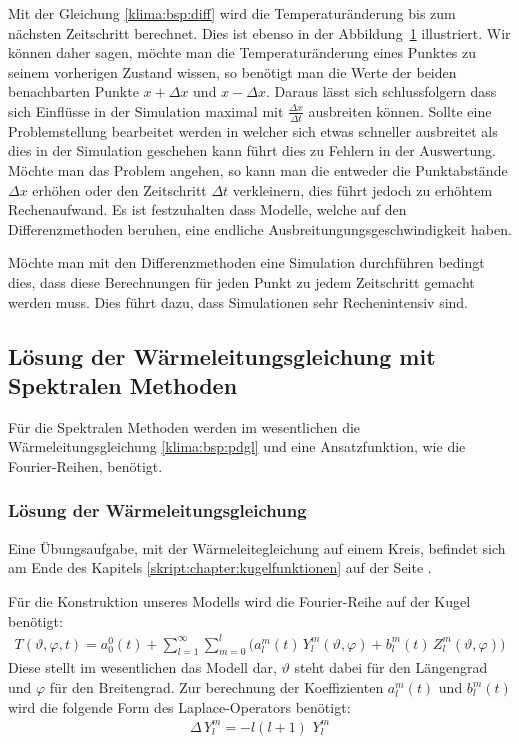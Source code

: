 \begin{refsection}
\begin{figure}
\caption{
\label{klima:wettervorhersagen:diff}}
\end{figure}
Mit der Gleichung \eqref{klima:bsp:diff} wird die Temperaturänderung bis zum nächsten Zeitschritt berechnet. Dies ist ebenso in der Abbildung~\ref{klima:wettervorhersagen:diff} illustriert. Wir können daher sagen, möchte man die Temperaturänderung eines Punktes zu seinem vorherigen Zustand wissen, so benötigt man die Werte der beiden benachbarten Punkte $x+\Delta x$ und $x-\Delta x$. Daraus lässt sich schlussfolgern dass sich Einflüsse in der Simulation maximal mit $\frac{\Delta x}{\Delta t}$ ausbreiten können. Sollte eine Problemstellung bearbeitet werden in welcher sich etwas schneller ausbreitet als dies in der Simulation geschehen kann führt dies zu Fehlern in der Auswertung. Möchte man das Problem angehen, so kann man die entweder die Punktabstände $\Delta x$ erhöhen oder den Zeitschritt $\Delta t$ verkleinern, dies führt jedoch zu erhöhtem Rechenaufwand. Es ist festzuhalten dass Modelle, welche auf den Differenzmethoden beruhen, eine endliche Ausbreitungungsgeschwindigkeit haben.

Möchte man mit den Differenzmethoden eine Simulation durchführen bedingt dies, dass diese Berechnungen für jeden Punkt zu jedem Zeitschritt gemacht werden muss. Dies führt dazu, dass Simulationen sehr Rechenintensiv sind.


\subsection{Lösung der Wärmeleitungsgleichung mit Spektralen Methoden}
Für die Spektralen Methoden werden im wesentlichen die Wärmeleitungsgleichung \eqref{klima:bsp:pdgl}
und eine Ansatzfunktion, wie die Fourier-Reihen, benötigt.


\subsubsection{Lösung der Wärmeleitungsgleichung}
Eine Übungsaufgabe, mit der Wärmeleitegleichung auf einem Kreis, befindet sich am Ende des Kapitels \ref{skript:chapter:kugelfunktionen}  auf der Seite \pageref{skript:1101:pdgl}.

Für die Konstruktion unseres Modells wird die Fourier-Reihe auf der Kugel benötigt:
\begin{align}
T(\vartheta ,\varphi ,t)
=
a^0_0(t) + \sum_{l=1}^\infty\sum_{m=0}^l \bigl( a^m_l(t)\,Y^m_l(\vartheta ,\varphi)+b^m_l(t)\,Z^m_l(\vartheta ,\varphi) \bigr)
\label{klima:equation:fourier}
\end{align}
Diese stellt im wesentlichen das Modell dar, $\vartheta$ steht dabei für den Längengrad und $\varphi$ für den Breitengrad. Zur berechnung der Koeffizienten $a^m_l(t)$ und $b^m_l(t)$ wird die folgende Form des Laplace-Operators benötigt:
\begin{align}
\Delta \,Y^m_l=-l(l+1)\,\,Y^m_l
\label{klima:equation:laplace}
\end{align}


\end{refsection}

